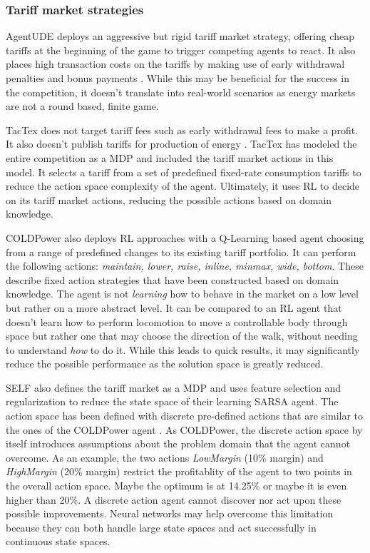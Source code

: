 \subsubsection{Tariff market strategies}%
\label{ssub:tariff_market_strategies}

AgentUDE deploys an aggressive but rigid tariff market strategy, offering cheap tariffs at the beginning of the game to
trigger competing agents to react. It also places high transaction costs on the tariffs by making use of early
withdrawal penalties and bonus payments \cite[]{ozdemir2017strategy}. While this may be beneficial for the success in the
competition, it doesn't translate into real-world scenarios as energy markets are not a round based, finite game.

TacTex does not target tariff fees such as early withdrawal fees to make a profit. It also doesn't publish tariffs for
production of energy \cite[]{tactexurieli2016mdp}. TacTex has modeled the entire competition as a \ac{MDP} and included the
tariff market actions in this model. It selects a tariff from a set of predefined fixed-rate consumption tariffs to
reduce the action space complexity of the agent. Ultimately, it uses \ac{RL} to decide on its tariff market
actions, reducing the possible actions based on domain knowledge.

COLDPower also deploys \ac{RL} approaches with a Q-Learning based agent choosing from a range of predefined changes to
its existing tariff portfolio. It can perform the following actions: \emph{maintain, lower, raise, inline, minmax, wide,
bottom}. These describe fixed action strategies that have been constructed based on domain knowledge. The agent
is not \emph{learning} how to behave in the market on a low level but rather on a more abstract level. It can be
compared to an \ac{RL} agent that doesn't learn how to perform locomotion to move a controllable body through space but
rather one that may choose the direction of the walk, without needing to understand \emph{how} to do it. While this
leads to quick results, it may significantly reduce the possible performance as the solution space is greatly reduced.

\ac{SELF} also defines the tariff market as a \ac{MDP} and uses feature selection and regularization to reduce the state
space of their learning \ac{SARSA} agent. The action space has been defined with discrete pre-defined actions that are
similar to the ones of the COLDPower agent \cite[]{peters2013reinforcement}. As COLDPower, the discrete action space by itself introduces assumptions about
the problem domain that the agent cannot overcome. As an example, the two actions \emph{LowMargin} (10\% margin) and
\emph{HighMargin} (20\% margin) restrict the profitablity of the agent to two points in the overall action space. Maybe
the optimum is at 14.25\% or maybe it is even higher than 20\%. A discrete action agent cannot discover nor act upon
these possible improvements. Neural networks may help overcome this limitation because they can both handle large state spaces
and act successfully in continuous state spaces.



